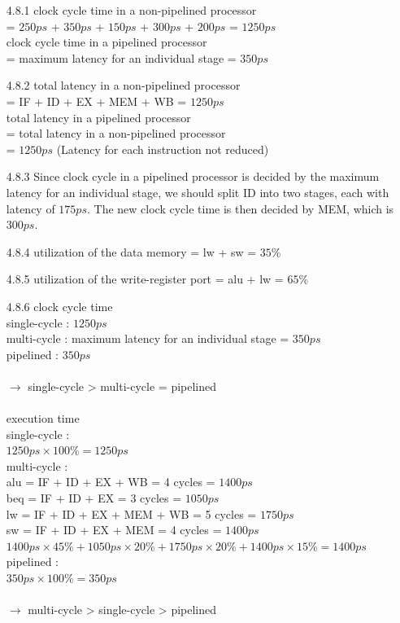\documentclass[12pt, a4paper]{article}
\begin{document}
\begin{itemize}[font=\bfseries]
\item[4.8.1]
clock cycle time in a non-pipelined processor \\ = $250ps$ + $350ps$ + $150ps$ + $300ps$ + $200ps$ = $1250ps$ \\
clock cycle time in a pipelined processor \\ = maximum latency for an individual stage = $350ps$
\item[4.8.2]
total latency in a non-pipelined processor \\ = IF + ID + EX + MEM + WB = $1250ps$ \\
total latency in a pipelined processor \\ = total latency in a non-pipelined processor \\ = $1250ps$ (Latency for each instruction not reduced) 
\item[4.8.3]
Since clock cycle in a pipelined processor is decided by the maximum latency for an individual stage, we should split ID into two stages, each with latency of $175ps$. The new clock cycle time is then decided by MEM, which is $300ps$.
\item[4.8.4]
utilization of the data memory = lw + sw = $35\%$
\item[4.8.5]
utilization of the write-register port = alu + lw = $65\%$
\item[4.8.6]
clock cycle time \\
single-cycle : $1250ps$ \\
multi-cycle : maximum latency for an individual stage = $350ps$ \\
pipelined : $350ps$ \\
\vspace*{-0.4cm} \\
$\longrightarrow$ single-cycle > multi-cycle = pipelined \\
\vspace*{-0.3cm} \\
execution time \\
single-cycle : \\
$1250ps \times 100\% = 1250ps$ \\
multi-cycle : \\
alu = IF + ID + EX + WB = 4 cycles = $1400ps$ \\
beq = IF + ID + EX = 3 cycles = $1050ps$ \\
lw = IF + ID + EX + MEM + WB = 5 cycles = $1750ps$ \\
sw = IF + ID + EX + MEM = 4 cycles = $1400ps$ \\
$1400ps \times 45\% + 1050ps \times 20\% + 1750ps \times 20\% + 1400ps \times 15\% = 1400ps$ \\
pipelined : \\
$350ps \times 100\% = 350ps$ \\
\vspace*{-0.4cm} \\
$\longrightarrow$ multi-cycle > single-cycle > pipelined \\


\end{itemize}
\end{document}
